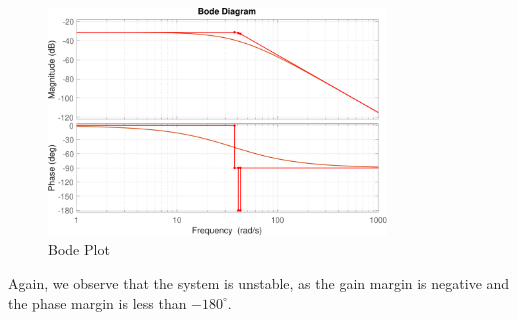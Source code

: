\begin{figure}[H]
    \centering
    \includegraphics[width=0.8\textwidth]{./img/MATLAB/analysis/bode_plot.pdf}
    \caption{Bode Plot}
    \label{fig:bode_plot}
\end{figure}

Again, we observe that the system is unstable, as the gain margin is negative and the phase margin is less than $-180^{\circ}$.